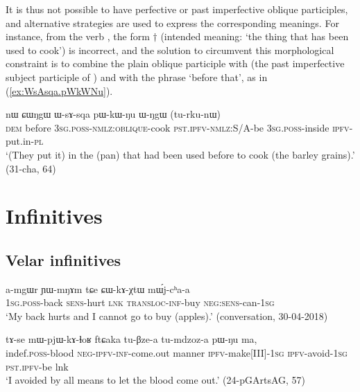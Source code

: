 It is thus not possible to have perfective or past imperfective oblique participles, and alternative strategies are used to express the corresponding meanings. For instance, from the verb , the form $\dagger$ (intended meaning: `the thing that has been used to cook') is incorrect, and the solution to circumvent this morphological constraint is to combine the plain oblique participle  with  (the past imperfective subject participle of ) and with the phrase  `before that', as in (\ref{ex:WsAsqa.pWkWNu}).

\begin{exe}
\ex \label{ex:WsAsqa.pWkWNu}
\gll  nɯ ɕɯŋgɯ ɯ-sɤ-sqa pɯ-kɯ-ŋu ɯ-ŋgɯ (tu-rku-nɯ) \\
\textsc{dem} before \textsc{3sg}.\textsc{poss}-\textsc{nmlz}:\textsc{oblique}-cook \textsc{pst}.\textsc{ipfv}-\textsc{nmlz}:S/A-be \textsc{3sg}.\textsc{poss}-inside \textsc{ipfv}-put.in-\textsc{pl} \\
\glt `(They put it) in the (pan) that had been used before to cook (the barley grains).' (31-cha, 64)
\end{exe}


\section{Infinitives}

\subsection{Velar infinitives} \label{sec:velar.inf}


\begin{exe}
\ex \label{ex:CWkAXtW}
\gll a-mgɯr ɲɯ-mŋɤm tɕe ɕɯ-kɤ-χtɯ mɯ́j-cʰa-a \\
\textsc{1sg}.\textsc{poss}-back \textsc{sens}-hurt \textsc{lnk} \textsc{transloc}-\textsc{inf}-buy \textsc{neg}:\textsc{sens}-can-\textsc{1sg} \\
\glt `My back hurts and I cannot go to  buy (apples).' (conversation, 30-04-2018)
\end{exe}

\begin{exe}
\ex \label{mWpjWkAlhoR.ftCaka}
 \gll  tɤ-se mɯ-pjɯ-kɤ-ɬoʁ ftɕaka tu-βze-a tu-mdzoz-a pɯ-ŋu ma, \\
 indef.\textsc{poss}-blood \textsc{neg}-\textsc{ipfv}-\textsc{inf}-come.out manner \textsc{ipfv}-make[III]-\textsc{1sg} \textsc{ipfv}-avoid-\textsc{1sg} \textsc{pst}.\textsc{ipfv}-be lnk \\
\glt `I avoided by all means to let the blood come out.' (24-pGArtsAG, 57)
 \end{exe}

